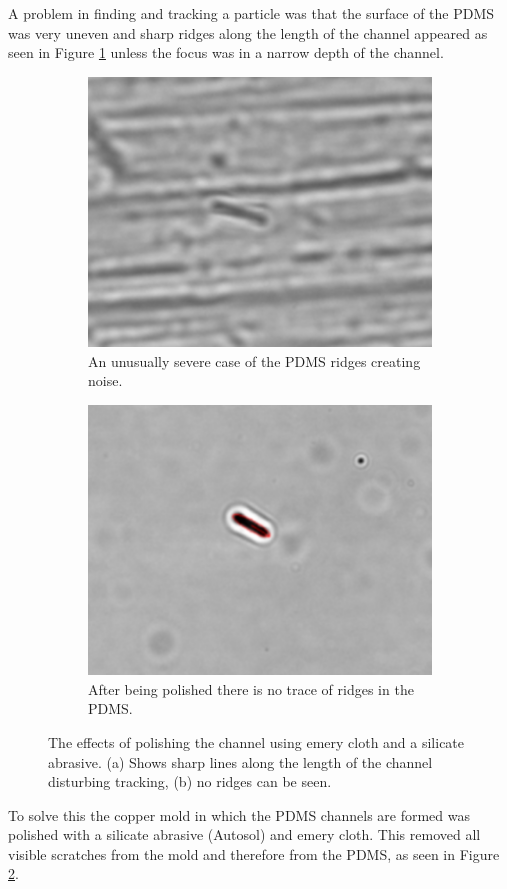 A problem in finding and tracking a particle was that the surface of the PDMS was very uneven and sharp ridges along the length of the channel appeared as seen in Figure \ref{fig:unpolished} unless the focus was in a narrow depth of the channel. 
 
 \begin{figure}[H]
 \centering
 \begin{subfigure}[3a]{0.40\textwidth}
 \includegraphics[width=\textwidth]{figures/improvements/unpolished.png}
 \caption{An unusually severe case of the PDMS ridges creating noise.}\label{fig:unpolished}
 \end{subfigure}\hspace{1em}%
 \begin{subfigure}[3b]{0.40\textwidth}
 \includegraphics[width=\textwidth]{figures/improvements/polished.png}
 \caption{After being polished there is no trace of ridges in the PDMS.}\label{fig:polished}
 \end{subfigure}
 \caption{The effects of polishing the channel using emery cloth and a silicate abrasive. (a) Shows sharp lines along the length of the channel disturbing tracking, (b) no ridges can be seen.}
 \label{fig:polisheffect}
 \end{figure}

To solve this the copper mold in which the PDMS channels are formed was polished with a silicate abrasive (Autosol) and emery cloth. This removed all visible scratches from the mold and therefore from the PDMS, as seen in Figure \ref{fig:polished}.